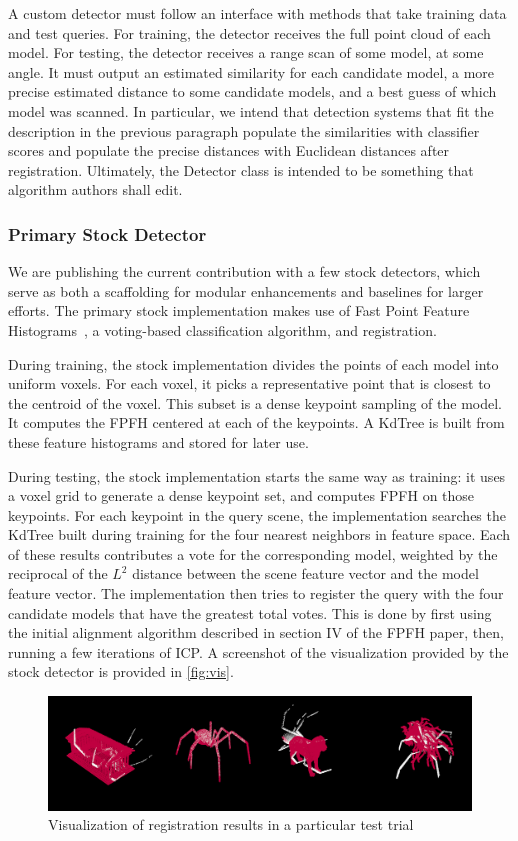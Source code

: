A custom detector must follow an interface with methods that take training data and test queries.
For training, the detector receives the full point cloud of each model.
For testing, the detector receives a range scan of some model, at some angle. It must output an estimated similarity for each candidate model, a more precise estimated distance to some candidate models, and a best guess of which model was scanned.
In particular, we intend that detection systems that fit the description in the previous paragraph populate the similarities with classifier scores and populate the precise distances with Euclidean distances after registration.
Ultimately, the Detector class is intended to be something that algorithm authors shall edit.

\subsubsection{Primary Stock Detector}
We are publishing the current contribution with a few stock detectors, which serve as both a scaffolding for modular enhancements and baselines for larger efforts.
The primary stock implementation makes use of Fast Point Feature Histograms~\cite{fpfh1, fpfh2}, a voting-based classification algorithm, and registration.

During training, the stock implementation divides the points of each model into uniform voxels. For each voxel, it picks a representative point that is closest to the centroid of the voxel. This subset is a dense keypoint sampling of the model. It computes the FPFH centered at each of the keypoints. A KdTree is built from these feature histograms and stored for later use.

During testing, the stock implementation starts the same way as training: it uses a voxel grid to generate a dense keypoint set, and computes FPFH on those keypoints.
For each keypoint in the query scene, the implementation searches the KdTree built during training for the four nearest neighbors in feature space. Each of these results contributes a vote for the corresponding model, weighted by the reciprocal of the $L^2$ distance between the scene feature vector and the model feature vector.
The implementation then tries to register the query with the four candidate models that have the greatest total votes.
This is done by first using the initial alignment algorithm described in section IV of the FPFH paper, then, running a few iterations of ICP.
A screenshot of the visualization provided by the stock detector is provided in \autoref{fig:vis}.
\begin{figure}[thpb]
  \centering
  \includegraphics[width=\columnwidth]{../figures/visualization.png}
  \caption{Visualization of registration results in a particular test trial}
  \label{fig:vis}
\end{figure}

